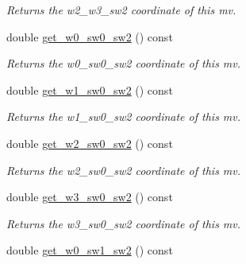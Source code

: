 \begin{DoxyCompactItemize}
\begin{DoxyCompactList}\small\item\em Returns the w2\-\_\-w3\-\_\-sw2 coordinate of this mv. \end{DoxyCompactList}\item 
\hypertarget{classe3ga_1_1mv_aa9f184c8e30524d1c50f2f48e7dbab13}{double \hyperlink{classe3ga_1_1mv_aa9f184c8e30524d1c50f2f48e7dbab13}{get\-\_\-w0\-\_\-sw0\-\_\-sw2} () const }\label{classe3ga_1_1mv_aa9f184c8e30524d1c50f2f48e7dbab13}

\begin{DoxyCompactList}\small\item\em Returns the w0\-\_\-sw0\-\_\-sw2 coordinate of this mv. \end{DoxyCompactList}\item 
\hypertarget{classe3ga_1_1mv_ace950e69d074c02538fc95ff118c29a2}{double \hyperlink{classe3ga_1_1mv_ace950e69d074c02538fc95ff118c29a2}{get\-\_\-w1\-\_\-sw0\-\_\-sw2} () const }\label{classe3ga_1_1mv_ace950e69d074c02538fc95ff118c29a2}

\begin{DoxyCompactList}\small\item\em Returns the w1\-\_\-sw0\-\_\-sw2 coordinate of this mv. \end{DoxyCompactList}\item 
\hypertarget{classe3ga_1_1mv_a8012be004c845a61ed2e08d05919e75c}{double \hyperlink{classe3ga_1_1mv_a8012be004c845a61ed2e08d05919e75c}{get\-\_\-w2\-\_\-sw0\-\_\-sw2} () const }\label{classe3ga_1_1mv_a8012be004c845a61ed2e08d05919e75c}

\begin{DoxyCompactList}\small\item\em Returns the w2\-\_\-sw0\-\_\-sw2 coordinate of this mv. \end{DoxyCompactList}\item 
\hypertarget{classe3ga_1_1mv_a75b93c0501acc6dfdc8d435aebe96045}{double \hyperlink{classe3ga_1_1mv_a75b93c0501acc6dfdc8d435aebe96045}{get\-\_\-w3\-\_\-sw0\-\_\-sw2} () const }\label{classe3ga_1_1mv_a75b93c0501acc6dfdc8d435aebe96045}

\begin{DoxyCompactList}\small\item\em Returns the w3\-\_\-sw0\-\_\-sw2 coordinate of this mv. \end{DoxyCompactList}\item 
\hypertarget{classe3ga_1_1mv_a586de65dec16e55f2f278745590734e9}{double \hyperlink{classe3ga_1_1mv_a586de65dec16e55f2f278745590734e9}{get\-\_\-w0\-\_\-sw1\-\_\-sw2} () const }\label{classe3ga_1_1mv_a586de65dec16e55f2f278745590734e9}


\end{DoxyCompactItemize}
